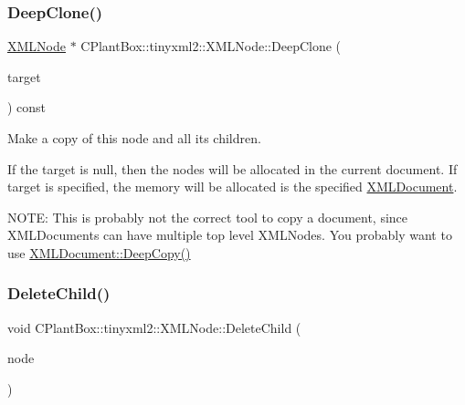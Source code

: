 \mbox{\label{classCPlantBox_1_1tinyxml2_1_1XMLNode_a444bb1393c147907bf4111439b377c15}} 
\subsubsection{\texorpdfstring{Deep\+Clone()}{DeepClone()}}
{\footnotesize\ttfamily \hyperlink{classCPlantBox_1_1tinyxml2_1_1XMLNode}{X\+M\+L\+Node} $\ast$ C\+Plant\+Box\+::tinyxml2\+::\+X\+M\+L\+Node\+::\+Deep\+Clone (\begin{DoxyParamCaption}\item[{\hyperlink{classCPlantBox_1_1tinyxml2_1_1XMLDocument}{X\+M\+L\+Document} $\ast$}]{target }\end{DoxyParamCaption}) const}

Make a copy of this node and all its children.

If the \textquotesingle{}target\textquotesingle{} is null, then the nodes will be allocated in the current document. If \textquotesingle{}target\textquotesingle{} is specified, the memory will be allocated is the specified \hyperlink{classCPlantBox_1_1tinyxml2_1_1XMLDocument}{X\+M\+L\+Document}.

N\+O\+TE\+: This is probably not the correct tool to copy a document, since X\+M\+L\+Documents can have multiple top level X\+M\+L\+Nodes. You probably want to use \hyperlink{classCPlantBox_1_1tinyxml2_1_1XMLDocument_adea3308f51d844c580cc29bb7bc5b32b}{X\+M\+L\+Document\+::\+Deep\+Copy()} \mbox{\label{classCPlantBox_1_1tinyxml2_1_1XMLNode_afbab01f2230e6b9a9327a92e4de92fd0}} 
\subsubsection{\texorpdfstring{Delete\+Child()}{DeleteChild()}}
{\footnotesize\ttfamily void C\+Plant\+Box\+::tinyxml2\+::\+X\+M\+L\+Node\+::\+Delete\+Child (\begin{DoxyParamCaption}\item[{\hyperlink{classCPlantBox_1_1tinyxml2_1_1XMLNode}{X\+M\+L\+Node} $\ast$}]{node }\end{DoxyParamCaption})}

